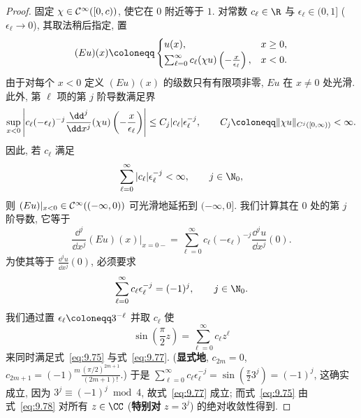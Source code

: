 \begin{proof}
固定 $\chi \in \mathcal{C}^\infty([0, c))$, 使它在 $0$ 附近等于 $1$. 对常数 $c_\ell \in \R$ 与 $\epsilon_\ell \in (0, 1]$ ($\epsilon_\ell \to 0$), 其取法稍后指定, 置
\begin{equation}\label{eq:9.73}
    (Eu)(x) \defeq
    \begin{cases}
        u(x), & x \ge 0, \\
        \sum_{\ell=0}^{\infty} c_\ell (\chi u)\left(-\frac{x}{\epsilon_\ell}\right), & x < 0.
    \end{cases}
\end{equation}
由于对每个 $x < 0$ 定义 $(Eu)(x)$ 的级数只有有限项非零, $Eu$ 在 $x \neq 0$ 处光滑. 此外, 第 $\ell$ 项的第 $j$ 阶导数满足界
\begin{equation}\label{eq:9.74}
    \sup_{x<0} \left| c_\ell (-\epsilon_\ell)^{-j} \frac{\dd^j}{\dd x^j}(\chi u)\left(-\frac{x}{\epsilon_\ell}\right) \right| \le C_j |c_\ell| \epsilon_\ell^{-j}, \qquad C_j \defeq \|\chi u\|_{C^j([0, \infty))} < \infty.
\end{equation}
因此, 若 $c_\ell$ 满足
\begin{equation}\label{eq:9.75}
    \sum_{\ell=0}^{\infty} |c_\ell| \epsilon_\ell^{-j} < \infty, \qquad j \in \N_0,
\end{equation}
则 $(Eu)|_{x<0} \in \mathcal{C}^\infty((-\infty, 0))$ 可光滑地延拓到 $(-\infty, 0]$. 我们计算其在 $0$ 处的第 $j$ 阶导数, 它等于
\begin{equation}\label{eq:9.76}
    \frac{\dd^j}{\dd x^j}(Eu)(x)\Big|_{x=0-} = \sum_{\ell=0}^{\infty} c_\ell (-\epsilon_\ell)^{-j} \frac{\dd^j u}{\dd x^j}(0).
\end{equation}
为使其等于 $\frac{\dd^j u}{\dd x^j}(0)$, 必须要求
\begin{equation}\label{eq:9.77}
    \sum_{\ell=0}^{\infty} c_\ell \epsilon_\ell^{-j} = (-1)^j, \qquad j \in \N_0.
\end{equation}
我们通过置 $\epsilon_\ell \defeq 3^{-\ell}$ 并取 $c_\ell$ 使
\begin{equation}\label{eq:9.78}
    \sin\left(\frac{\pi}{2} z\right) = \sum_{\ell=0}^{\infty} c_\ell z^\ell
\end{equation}
来同时满足式~\eqref{eq:9.75} 与式~\eqref{eq:9.77}. (\textbf{显式地}, $c_{2m} = 0$, $c_{2m+1} = (-1)^m \frac{(\pi/2)^{2m+1}}{(2m+1)!}$.) 于是 $\sum_{\ell=0}^{\infty} c_\ell \epsilon_\ell^{-j} = \sin(\frac{\pi}{2} 3^j) = (-1)^j$, 这确实成立, 因为 $3^j \equiv (-1)^j \bmod 4$, 故式~\eqref{eq:9.77} 成立; 而式~\eqref{eq:9.75} 由式~\eqref{eq:9.78} 对所有 $z \in \CC$ (\textbf{特别对} $z = 3^j$) 的绝对收敛性得到.


\end{proof}
